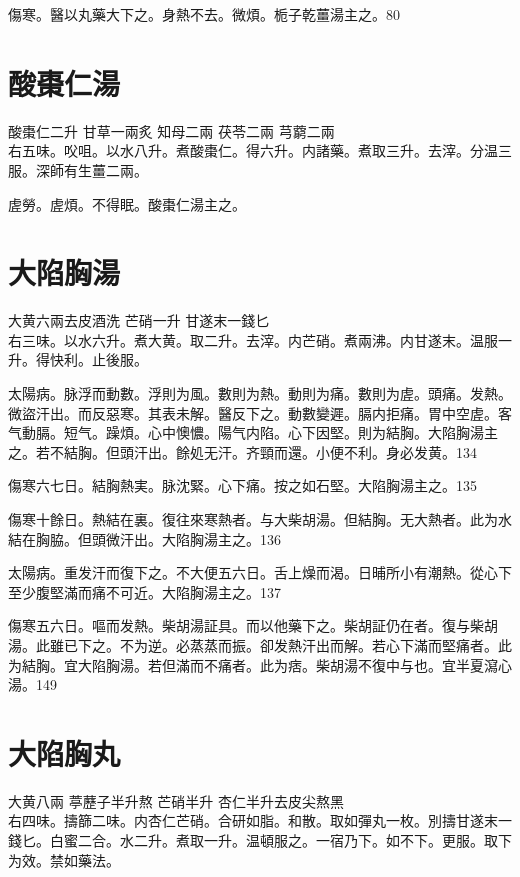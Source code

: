 傷寒。醫以丸藥大下之。身熱不去。微煩。栀子乾薑湯主之。80

\section{酸棗{\khaai 仁}湯}

酸棗仁{\scriptsize 二升} 甘草{\scriptsize 一兩炙} 知母{\scriptsize 二兩} 茯苓{\scriptsize 二兩} 芎藭{\scriptsize 二兩}\\
右五味。㕮咀。以水八升。煮酸棗仁。得六升。内諸藥。煮取三升。去滓。分温三服。{\scriptsize 深師有生薑二兩。}

虗勞。虗煩。不得眠。酸棗{\khaai 仁}湯主之。

\section{大陷胸湯}

大黄{\scriptsize 六兩去皮酒洗} 芒硝{\scriptsize 一升} 甘遂末{\scriptsize 一錢匕}\\
右三味。以水六升。煮大黄。取二升。去滓。内芒硝。煮兩沸。内甘遂末。温服一升。得快利。止後服。

太陽病。脉浮而動數。浮則为風。數則为熱。動則为痛。數則为虗。頭痛。发熱。微盜汗出。而反惡寒。其表未解。醫反下之。動數變遲。膈内拒痛。胃中空虗。客气動膈。短气。躁煩。心中懊憹。陽气内陷。心下因堅。則为結胸。大陷胸湯主之。若不結胸。但頭汗出。餘処无汗。齐頸而還。小便不利。身必发黄。134

傷寒六七日。結胸熱実。脉沈緊。心下痛。按之如石堅。大陷胸湯主之。135

傷寒十餘日。熱結在裏。復往來寒熱者。与大柴胡湯。但結胸。无大熱者。此为水結在胸脇。{\khaai 但}頭微汗出。大陷胸湯主之。136

太陽病。重发汗而復下之。不大便五六日。舌上燥而渴。日晡所小有潮熱。從心下至少腹堅滿而痛不可近。大陷胸湯主之。137

傷寒五六日。嘔而发熱。柴胡湯証具。而以他藥下之。柴胡証仍在者。復与柴胡湯。此雖已下之。不为逆。必蒸蒸而振。卻发熱汗出而解。若心下滿而堅痛者。此为結胸。宜大陷胸湯。若但滿而不痛者。此为痞。柴胡{\khaai 湯}不復中与也。宜半夏瀉心湯。149

\section{大陷胸丸}

大黄{\scriptsize 八兩} 葶藶子{\scriptsize 半升熬} 芒硝{\scriptsize 半升} 杏仁{\scriptsize 半升去皮尖熬黑}\\
右四味。擣篩二味。内杏仁芒硝。合研如脂。和散。取如彈丸一枚。別擣甘遂末一錢匕。白蜜二合。水二升。煮取一升。温頓服之。一宿乃下。如不下。更服。取下为效。禁如藥法。

